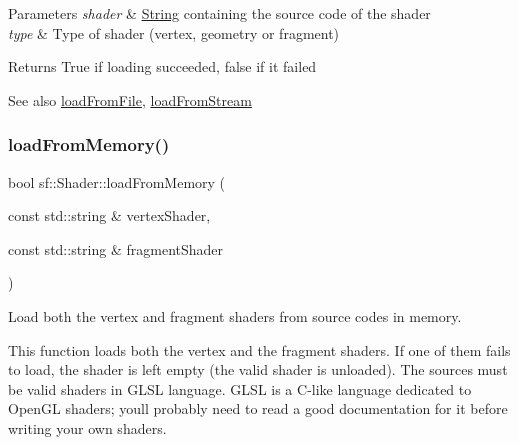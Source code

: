 \begin{DoxyParams}{Parameters}
{\em shader} & \hyperlink{classsf_1_1_string}{String} containing the source code of the shader \\
\hline
{\em type} & Type of shader (vertex, geometry or fragment)\\
\hline
\end{DoxyParams}
\begin{DoxyReturn}{Returns}
True if loading succeeded, false if it failed
\end{DoxyReturn}
\begin{DoxySeeAlso}{See also}
\hyperlink{classsf_1_1_shader_a053a5632848ebaca2fcd8ba29abe9e6e}{load\+From\+File}, \hyperlink{classsf_1_1_shader_a2ee1b130c0606e4f8bcdf65c1efc2a53}{load\+From\+Stream} 
\end{DoxySeeAlso}
\mbox{\label{classsf_1_1_shader_ae34e94070d7547a890166b7993658a9b}} 
\subsubsection{\texorpdfstring{load\+From\+Memory()}{loadFromMemory()}\hspace{0.1cm}{\footnotesize\ttfamily [2/3]}}
{\footnotesize\ttfamily bool sf\+::\+Shader\+::load\+From\+Memory (\begin{DoxyParamCaption}\item[{const std\+::string \&}]{vertex\+Shader,  }\item[{const std\+::string \&}]{fragment\+Shader }\end{DoxyParamCaption})}



Load both the vertex and fragment shaders from source codes in memory. 

This function loads both the vertex and the fragment shaders. If one of them fails to load, the shader is left empty (the valid shader is unloaded). The sources must be valid shaders in G\+L\+SL language. G\+L\+SL is a C-\/like language dedicated to Open\+GL shaders; you\textquotesingle{}ll probably need to read a good documentation for it before writing your own shaders.


